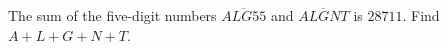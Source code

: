 The sum of the five-digit numbers $\overline{ALG55}$ and $\overline{ALGNT}$ is $28711$. Find $A+L+G+N+T$.
